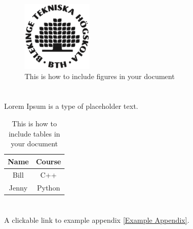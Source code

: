 \documentclass{report}
\begin{document}
\begin{figure}[H]
    \centering
    \includegraphics[width=0.3\textwidth]{bth-logo.png} %
    \caption{This is how to include figures in your document}
    \label{fig:exampleImg}
\end{figure}

\chapter{}
\lipsum[1-2] %
Lorem Ipsum is a type of placeholder text\cite{rundqvist2019}. %

\begin{table}[h]
    \centering
    \begin{tabular}{c|c}
        Name & Course\\ \hline
        Bill & C++ \\
        Jenny & Python
    \end{tabular}
    \caption{This is how to include tables in your document}
    \label{tab:exampleTable}
\end{table}{}

\chapter{}
\lipsum[1-2] %
A clickable link to example appendix \ref{Example Appendix}.

\chapter{}
\lipsum[1-2] %

\chapter{}
\lipsum[1-2] %
\end{document}
